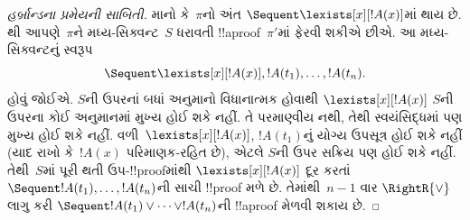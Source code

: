 \documentclass[../../../include/open-logic-section]{subfiles}
\begin{document}
\begin{proof}[હર્બ્રાન્ડના પ્રમેયની સાબિતી]
માનો કે~$\pi$નો અંત
$\Sequent \lexists[x][!A(x)]$માં
થાય છે.
થી
આપણે~$\pi$ને મધ્ય-સિક્વન્ટ~$S$
ધરાવતી !!a{proof}~$\pi'$માં
ફેરવી શકીએ છીએ. આ
મધ્ય-સિક્વન્ટનું સ્વરૂપ
\[\Sequent
\lexists[x][!A(x)], !A(t_1), \dots, !A(t_n).\]
હોવું જોઈએ.
$S$ની ઉપરનાં બધાં
અનુમાનો વિધાનાત્મક હોવાથી
$\lexists[x][!A(x)]$
$S$ની ઉપરના કોઈ અનુમાનમાં
મુખ્ય હોઈ શકે નહીં.
તે પરમાણ્વીય નથી, તેથી
સ્વયંસિદ્ધમાં પણ મુખ્ય
હોઈ શકે નહીં.
વળી~$\lexists[x][!A(x)]$,
$!A(t_1)$નું યોગ્ય
ઉપસૂત્ર હોઈ શકે નહીં
(યાદ રાખો કે~$!A(x)$
પરિમાણક-રહિત છે), એટલે
$S$ની ઉપર સક્રિય પણ
હોઈ શકે નહીં.
તેથી~$S$માં પૂરી થતી
ઉપ-!!{proof}માંથી
$\lexists[x][!A(x)]$
દૂર કરતાં
$\Sequent !A(t_1), \dots, !A(t_n)$ની
સાચી !!{proof} મળે છે.
તેમાંથી~$n-1$ વાર
$\RightR{\lor}$ લાગુ કરી
$\Sequent !A(t_1) \lor \dots \lor !A(t_n)$ની
!!a{proof} મેળવી શકાય છે.
\end{proof}

\end{document}
